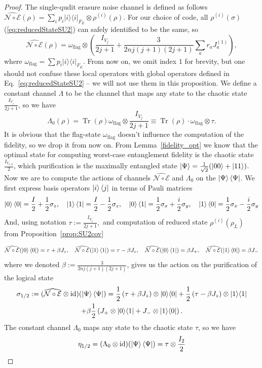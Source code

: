 \documentclass[10pt,twocolumn,superscriptaddress,aps,amsmath,amssymb,citeautoscript,floatfix,prx]{revtex4-2}
\theoremstyle{plain}
\theoremstyle{plain}
\theoremstyle{plain}
\theoremstyle{plain}
\theoremstyle{plain}
\theoremstyle{plain}
\theoremstyle{plain}
\theoremstyle{definition}
\theoremstyle{plain}
\begin{document}
\begin{appendix}
\begin{proof}
The single-qudit erasure noise channel is defined as follows
$
    \widehat{\mathcal{N} \circ \mathcal{E}}(\rho)=\sum_i p_i|i\rangle\langle i|_{F_E} \otimes \rho^{(i)}(\rho) .
$
For our choice of code, all $\rho^{(i)}(\sigma)$ (\ref{eq:reducedStateSU2}) can safely identified to be the same, so
$$
\widehat{\mathcal{N} \circ \mathcal{E}}(\rho)=\omega_{\text{flag}} \otimes \left(\frac{I_{V_j}}{2 j+1}+\frac{3}{2 n j(j+1)(2 j+1)} \sum_a r_a J_a^{(1)}\right),
$$
where
$
\omega_{\text{flag}}=\sum p_i|i\rangle\langle i|_{F_E}.$ From now on, we omit index $1$ for brevity, 
but one should not confuse these local operators with global operators defined in Eq.~\eqref{eq:reducedStateSU2} -- we will not use them in this proposition. 
We define a constant channel $\Lambda$ to be the channel that maps any state to the chaotic state $\frac{I_{V_j}}{2 j+1}$, so we have
\[
    \Lambda_0(\rho)=\operatorname{Tr}(\rho)\omega_{\text{flag}}\otimes \frac{I_{V_j}}{2 j+1} \equiv \operatorname{Tr}(\rho)\cdot\omega_{\text{flag}}\otimes\tau.
\]
It is obvious that the flag-state $\omega_{\text{flag}}$ doesn't influence the computation of the fidelity, so we drop it from now on. 
From Lemma~\ref{fidelity_opt} we know that the optimal state for computing worst-case entanglement fidelity is the chaotic state $\frac{I_{{V_{1/2}}}}{2}$, 
which purification is the maximally entangled state $\ket{\Psi}=\frac{1}{\sqrt{2}}(|00\rangle+|11\rangle)$. 
Now we are to compute the actions of channels $\widehat{\mathcal{N} \circ \mathcal{E}}$ and $\Lambda_0$ on the $\ket{\Psi}\bra{\Psi}$. 
We first express basis operators $\ket{i}\bra{j}$ in terms of Pauli matrices
\[
    \ket{0}\bra{0}=\frac{I}{2} + \frac{1}{2} \sigma_z, \quad \ket{1}\bra{1}=\frac{I}{2} - \frac{1}{2} \sigma_z, \quad \ket{0}\bra{1}=\frac{1}{2} \sigma_x + \frac{i}{2} \sigma_y, \quad \ket{1}\bra{0}=\frac{1}{2} \sigma_x - \frac{i}{2} \sigma_y
\]
And, using notation $\tau:=\frac{I_{V_j}}{2j+1},$ and computation of reduced state $\rho^{(i)}\left(\rho_L\right)$ from Proposition~\ref{prop:SU2cov}

\[
    \widehat{\mathcal{N} \circ \mathcal{E}}(\ket{0}\bra{0})=\tau+\beta J_z, \quad \widehat{\mathcal{N} \circ \mathcal{E}}(\ket{1}\bra{1})=\tau-\beta J_z, \quad \widehat{\mathcal{N} \circ \mathcal{E}}(\ket{0}\bra{1})=\beta J_+, \quad \widehat{\mathcal{N} \circ \mathcal{E}}(\ket{1}\bra{0})=\beta J_-
\]
where we denoted $\beta:=\frac{3}{2 n j(j+1)(2 j+1)}$, gives us the action on the purification of the logical state
\[
    \begin{gathered}
    \sigma_{1/2}:=(\widehat{\mathcal{N} \circ \mathcal{E}} \otimes \mathrm{id})(\ket{\Psi}\bra{\Psi})=\frac{1}{2}\left(\tau+\beta J_z\right) \otimes|0\rangle\langle 0|+\frac{1}{2}\left(\tau-\beta J_z\right) \otimes|1\rangle\langle 1| \\
    +\beta \frac{1}{2}\left(J_{+} \otimes|0\rangle\langle 1|+J_{-} \otimes|1\rangle\langle 0|\right) .
    \end{gathered}
\]
The constant channel $\Lambda_0$ maps any state to the chaotic state $\tau$, so we have
\[
    \eta_{1/2}=(\Lambda_0 \otimes \mathrm{id})(\ket{\Psi}\bra{\Psi})=\tau \otimes \frac{I_2}{2}
\]


\end{proof}
\end{appendix}
\end{document}
